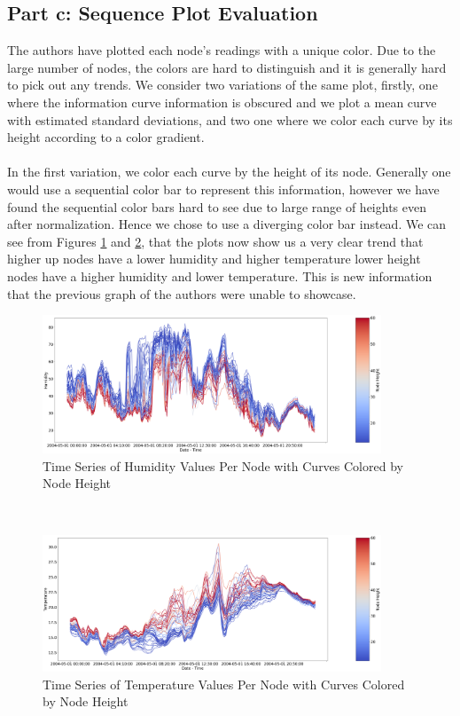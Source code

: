\documentclass[11pt, letterpaper]{article}
\begin{document}
\subsection{Part c: Sequence Plot Evaluation}
The authors have plotted each node's readings with a unique color. Due to the large number of nodes, the colors are hard to distinguish and it is generally hard to pick out any trends. We consider two variations of the same plot, firstly, one where the information curve information is obscured and we plot a mean curve with estimated standard deviations, and two one where we color each curve by its height according to a color gradient.
\\
\\
In the first variation, we color each curve by the height of its node. Generally one would use a sequential color bar to represent this information, however we have found the sequential color bars hard to see due to large range of heights even after normalization. Hence we chose to use a diverging color bar instead. We can see from Figures \ref{fig:graph_crtique_c1} and \ref{fig:graph_crtique_c2}, that the plots now show us a very clear trend that higher up nodes have a lower humidity and higher temperature lower height nodes have a higher humidity and lower temperature.  This is new information that the previous graph of the authors were unable to showcase.
\begin{figure}[h!]
\centering
\captionsetup{justification=centering}
\includegraphics[width=0.9\textwidth]{Report Images/fig8_graph_critique_c1.png}
\caption{Time Series of Humidity Values Per Node with Curves Colored by Node Height}
\label{fig:graph_crtique_c1}
\end{figure}
\\
\begin{figure}[h!]
\centering
\captionsetup{justification=centering}
\includegraphics[width=0.9\textwidth]{Report Images/fig8_graph_critique_c2.png}
\caption{Time Series of Temperature Values Per Node with Curves Colored by Node Height}
\label{fig:graph_crtique_c2}
\end{figure}
\\
\end{document}
